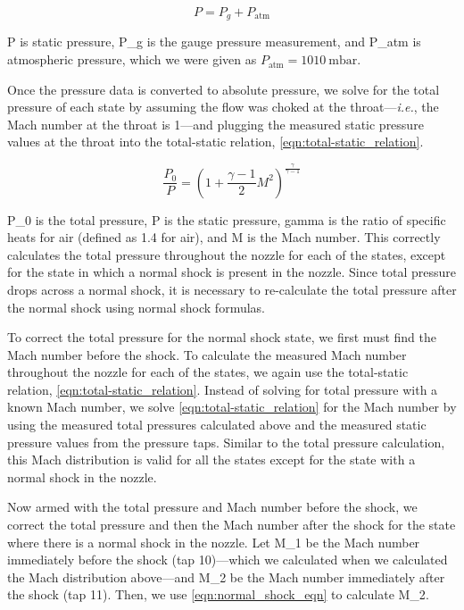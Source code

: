 \begin{equation} \label{eqn:absolute_pressure_eqn}
    P = P_g + P_\text{atm}
\end{equation}

\noindent{}\gls{P} is static pressure, \gls{P_g} is the gauge pressure measurement, and \gls{P_atm} is atmospheric pressure, which we were given as $P_\text{atm} = \qty{1010}{\milli\bar}$.

Once the pressure data is converted to absolute pressure, we solve for the total pressure of each state by assuming the flow was choked at the throat—\textit{i.e.}, the Mach number at the throat is \num{1}—and plugging the measured static pressure values at the throat into the total-static relation, \autoref{eqn:total-static_relation}.

\begin{equation} \label{eqn:total-static_relation}
    \frac{P_0}{P} = \left(1 + \frac{\gamma - 1}{2}M^2\right)^\frac{\gamma}{\gamma - 1}
\end{equation}

\noindent{}\gls{P_0} is the total pressure, \gls{P} is the static pressure, \gls{gamma} is the ratio of specific heats for air (defined as \num{1.4} for air), and \gls{M} is the Mach number. This correctly calculates the total pressure throughout the nozzle for each of the states, except for the state in which a normal shock is present in the nozzle. Since total pressure drops across a normal shock, it is necessary to re-calculate the total pressure after the normal shock using normal shock formulas.

To correct the total pressure for the normal shock state, we first must find the Mach number before the shock. To calculate the measured Mach number throughout the nozzle for each of the states, we again use the total-static relation, \autoref{eqn:total-static_relation}. Instead of solving for total pressure with a known Mach number, we solve \autoref{eqn:total-static_relation} for the Mach number by using the measured total pressures calculated above and the measured static pressure values from the pressure taps. Similar to the total pressure calculation, this Mach distribution is valid for all the states except for the state with a normal shock in the nozzle.

Now armed with the total pressure and Mach number before the shock, we correct the total pressure and then the Mach number after the shock for the state where there is a normal shock in the nozzle. Let \gls{M_1} be the Mach number immediately before the shock (tap \num{10})—which we calculated when we calculated the Mach distribution above—and \gls{M_2} be the Mach number immediately after the shock (tap \num{11}). Then, we use \autoref{eqn:normal_shock_eqn} to calculate \gls{M_2}.

